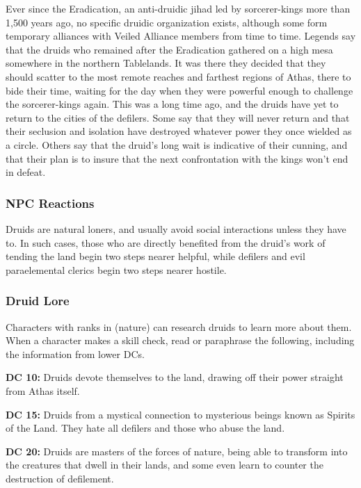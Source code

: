 Ever since the Eradication, an anti-druidic jihad led by sorcerer-kings more than 1,500 years ago, no specific druidic organization exists, although some form temporary alliances with Veiled Alliance members from time to time. Legends say that the druids who remained after the Eradication gathered on a high mesa somewhere in the northern Tablelands. It was there they decided that they should scatter to the most remote reaches and farthest regions of Athas, there to bide their time, waiting for the day when they were powerful enough to challenge the sorcerer-kings again. This was a long time ago, and the druids have yet to return to the cities of the defilers. Some say that they will never return and that their seclusion and isolation have destroyed whatever power they once wielded as a circle. Others say that the druid's long wait is indicative of their cunning, and that their plan is to insure that the next confrontation with the kings won't end in defeat.

\subsubsection{NPC Reactions}

Druids are natural loners, and usually avoid social interactions unless they have to. In such cases, those who are directly benefited from the druid's work of tending the land begin two steps nearer helpful, while defilers and evil paraelemental clerics begin two steps nearer hostile.

\subsubsection{Druid Lore}

Characters with ranks in  (nature) can research druids to learn more about them. When a character makes a skill check, read or paraphrase the following, including the information from lower DCs.

\textbf{DC 10:} Druids devote themselves to the land, drawing off their power straight from Athas itself.

\textbf{DC 15:} Druids from a mystical connection to mysterious beings known as Spirits of the Land. They hate all defilers and those who abuse the land.

\textbf{DC 20:} Druids are masters of the forces of nature, being able to transform into the creatures that dwell in their lands, and some even learn to counter the destruction of defilement.
